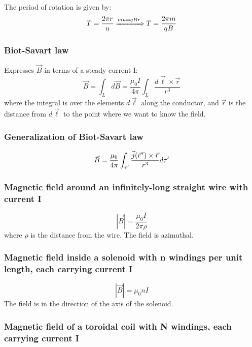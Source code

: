 \documentclass[english,11pt]{article}
\newcommand{\pvec}[1]{\vec{#1}\mkern2mu\vphantom{#1}}
\begin{document}
The period of rotation is given by:
\begin{equation*}
  T = \frac{2\pi r}{u} \xRightarrow{m u = q B r}
  T = \frac{2\pi m}{q B}
\end{equation*}

\subsubsection*{\bf Biot-Savart law}

Expresses $\vec{B}$ in terms of a steady current I:
\begin{equation*}
  \vec{B} = \int_{L} d\vec{B}
      = \frac{\mu_0I}{4\pi} \int_{L} \frac{d\vec{\ell} \times \vec{r}}{r^3}
\end{equation*}
where the integral is over the elements $d\vec{\ell}$ along the conductor, and $\vec{r}$
is the distance from $d\vec{\ell}$ to the point where we want to know the field.

\subsubsection*{\bf Generalization of Biot-Savart law}

\begin{equation*}
    \vec{B} =
      \frac{\mu_0}{4\pi} \int_{\tau^{\prime}}
         \frac{\vec{j}(\pvec{r}') \times \vec{r}}{r^{3}} d\tau^{\prime}
\end{equation*}


\subsubsection*{\bf Magnetic field around an infinitely-long straight wire with current I}
\begin{equation*}
      |\vec{B}| = \frac{\mu_0I}{2\pi \rho}
\end{equation*}
where $\rho$ is the distance from the wire.
The field is azimuthal.

\subsubsection*{\bf Magnetic field inside a solenoid with n windings per unit length, each carrying current I}
\begin{equation*}
      |\vec{B}| = \mu_0 n I
\end{equation*}
The field is in the direction of the axis of the solenoid.

\subsubsection*{\bf Magnetic field of a toroidal coil with N windings, each carrying current I}
\end{document}

